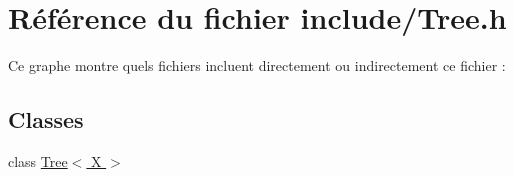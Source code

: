 \hypertarget{a00038}{
\section{Référence du fichier include/Tree.h}
\label{a00038}
}
Ce graphe montre quels fichiers incluent directement ou indirectement ce fichier :
\subsection*{Classes}
\begin{DoxyCompactItemize}
\item 
class \hyperlink{a00017}{Tree$<$ X $>$}
\end{DoxyCompactItemize}
